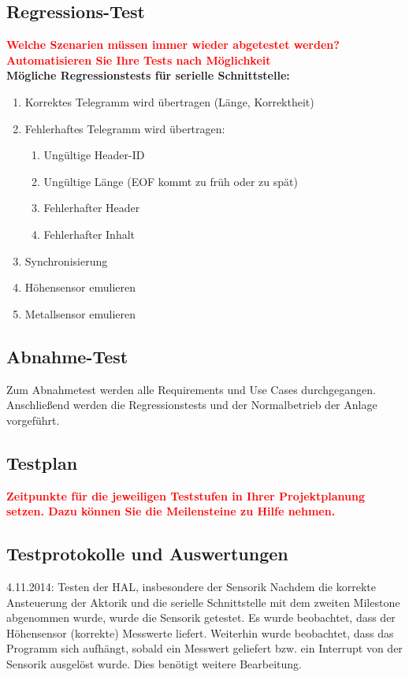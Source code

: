 \documentclass[oneside,a4paper,titlepage]{scrartcl} %
\begin{document}
\subsection{Regressions-Test}
\textcolor{red}{\textbf{Welche Szenarien müssen immer wieder abgetestet werden? Automatisieren Sie Ihre Tests nach
Möglichkeit}}\\
\newline
\textbf{Mögliche Regressionstests für serielle Schnittstelle:}\\
\begin{enumerate}
 \item Korrektes Telegramm wird übertragen (Länge, Korrektheit)
 \item Fehlerhaftes Telegramm wird übertragen:
 \begin{enumerate}
  \item Ungültige Header-ID
  \item Ungültige Länge (EOF kommt zu früh oder zu spät)
  \item Fehlerhafter Header
  \item Fehlerhafter Inhalt
 \end{enumerate}
 \item Synchronisierung
 \item Höhensensor emulieren
 \item Metallsensor emulieren
\end{enumerate}

\subsection{Abnahme-Test}
Zum Abnahmetest werden alle Requirements und Use Cases durchgegangen. Anschließend werden
die Regressionstests und der Normalbetrieb der Anlage vorgeführt.

\subsection{Testplan}
\textcolor{red}{\textbf{Zeitpunkte für die jeweiligen Teststufen in Ihrer Projektplanung setzen.
Dazu können Sie die Meilensteine zu Hilfe nehmen.}}

\subsection{Testprotokolle und Auswertungen}
4.11.2014: Testen der HAL, insbesondere der Sensorik \newline
Nachdem die korrekte Ansteuerung der Aktorik und die serielle Schnittstelle mit dem zweiten Milestone abgenommen wurde, wurde die Sensorik getestet. Es wurde beobachtet, dass der H\"ohensensor (korrekte) Messwerte liefert. Weiterhin wurde beobachtet, dass das Programm sich aufh\"angt, sobald ein Messwert geliefert bzw. ein Interrupt von der Sensorik ausgel\"ost wurde. Dies ben\"otigt weitere Bearbeitung.\newline
\end{document}
